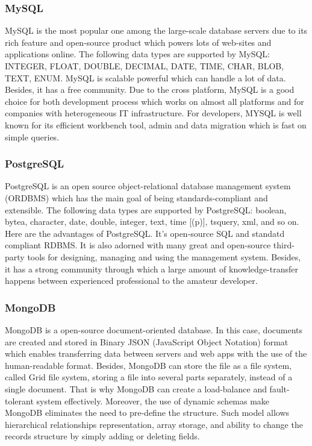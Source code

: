\subsubsection{MySQL}
MySQL is the most popular one among the large-scale database
servers due to its rich feature and open-source product which 
powers lots of web-sites and applications online. The following 
data types are supported by MySQL: INTEGER, FLOAT, DOUBLE, 
DECIMAL, DATE, TIME, CHAR, BLOB, TEXT, ENUM. MySQL is scalable
powerful which can handle a lot of data. Besides, it has 
a free community. Due to the cross platform, MySQL is a good 
choice for both development process which works on almost all 
platforms and for companies with heterogeneous IT infrastructure.
For developers, MYSQL is well known for its efficient workbench 
tool, admin and data migration which is fast on simple queries.

\subsubsection{PostgreSQL}
PostgreSQL is an open source object-relational database management
system (ORDBMS) which has the main goal of being standards-compliant 
and extensible. The following data types are supported by 
PostgreSQL: boolean, bytea, character, date, double, integer, 
text, time [(p)], tsquery, xml, and so on. Here are the advantages 
of PostgreSQL. It's open-source SQL and standatd compliant RDBMS. 
It is also adorned with many great and open-source third-party 
tools for designing, managing and using the management system.
Besides, it has a strong community through which a large amount 
of knowledge-transfer happens between experienced professional 
to the amateur developer. 

\subsubsection{MongoDB}
MongoDB is a open-source document-oriented database. In this 
case, documents are created and stored in Binary JSON 
(JavaScript Object Notation) format which enables 
transferring data between servers and web apps with 
the use of the human-readable format. Besides, MongoDB can 
store the file as a file system, called Grid file system, 
storing a file into several parts separately, instead
of a single document. That is why MongoDB can create a 
load-balance and fault-tolerant system effectively. Moreover,
the use of dynamic schemas make MongoDB eliminates the need to 
pre-define the structure. Such model allows hierarchical 
relationships representation, array storage, and ability 
to change the records structure by simply adding or deleting 
fields.


